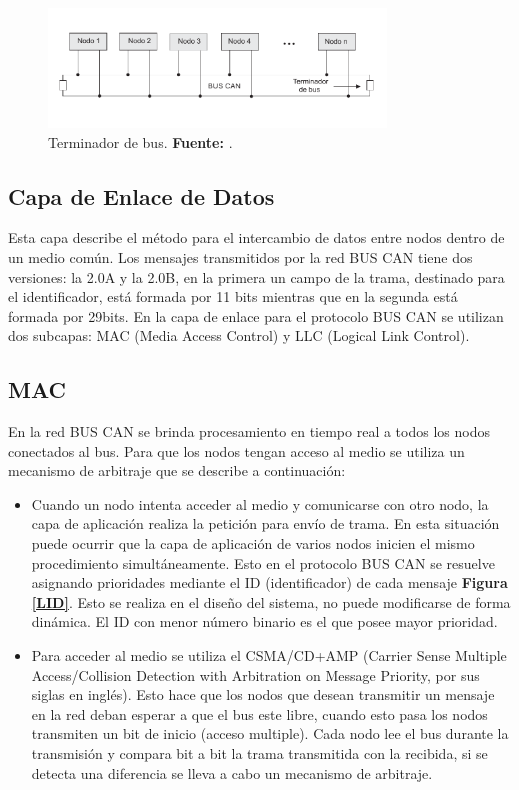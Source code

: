 \begin{figure}[H]
	\centering
		\includegraphics[width=0.8\textwidth]{./Cap2imagen/terminador.pdf}
	\caption[Terminador de bus.]{Terminador de bus.\textbf{ Fuente:} \cite{PSMR}.}
	\label{T_B} %
\end{figure}


\subsection {Capa de Enlace de Datos}
Esta capa describe el método para el intercambio de datos entre nodos dentro de un medio común.
Los mensajes transmitidos por la red BUS CAN tiene dos versiones: la 2.0A y la 2.0B, en la primera un campo de la trama, destinado para el identificador,  está formada por 11 bits mientras que en la segunda está formada por 29bits.
En la capa de enlace para el protocolo BUS CAN se utilizan dos subcapas: MAC (Media Access Control) y LLC (Logical Link Control).

\subsection {MAC}

En la red BUS CAN se brinda procesamiento en tiempo real a todos los nodos conectados al bus.  Para que los nodos tengan acceso al medio se utiliza un mecanismo de arbitraje que se describe a continuación:

\begin{itemize}
\item Cuando un nodo intenta acceder al medio y comunicarse con otro nodo, la capa de aplicación realiza la petición para envío de trama. En esta situación puede ocurrir que la capa de aplicación de varios nodos inicien el mismo procedimiento simultáneamente. Esto en el protocolo BUS CAN se resuelve asignando prioridades mediante el ID (identificador) de cada mensaje \textbf{Figura \ref{LID}}. Esto se realiza en el diseño del sistema, no puede modificarse de forma dinámica. El ID con menor número binario es el que posee mayor prioridad.
\item Para acceder al medio se utiliza el CSMA/CD+AMP (Carrier Sense Multiple Access/Collision Detection with Arbitration on Message Priority, por sus siglas en inglés). Esto hace que los nodos que desean transmitir un mensaje en la red deban esperar a que el bus este libre, cuando esto pasa los nodos transmiten un bit de inicio (acceso multiple). Cada nodo lee el bus durante la transmisión y compara bit a bit la trama transmitida con la recibida, si se detecta una diferencia se lleva a cabo un mecanismo de arbitraje.

\end {itemize}

